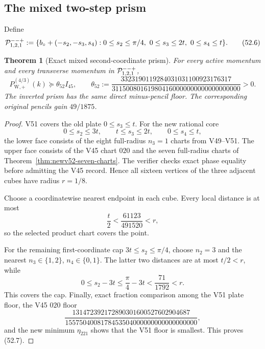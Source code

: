 \documentclass[11pt,oneside]{article}
\newtheorem{theorem}{Theorem}[section]
\theoremstyle{definition}
\theoremstyle{remark}
\begin{document}
\subsection{The mixed two-step prism}

Define
\[
 {\cal P}_{1,2,1}^{--+}:=
 \{b_\circ+(-s_2,-s_3,s_4):
 0\le s_2\le\pi/4,\ 0\le s_3\le2t,\ 0\le s_4\le t\}.
                                                               \tag{52.6}
\]

\begin{theorem}[Exact mixed second-coordinate prism]
\label{thm:newv52-mixed-prism}
For every active momentum and every transverse momentum in
\({\cal P}_{1,2,1}^{--+}\),
\[
 P_{\mathrm W,+}^{(4/3)}(k)
 \succeq\theta_{52}I_{45},\qquad
 \theta_{52}:=
 \frac{3323190119284031031100923176317}
 {311500801619804160000000000000000000}>0.             \tag{52.7}
\]
The inverted prism has the same direct minus-pencil floor.  The
corresponding original pencils gain \(49/1875\).
\end{theorem}

\begin{proof}
V51 covers the old plate \(0\le s_3\le t\).  For the new rational
core
\[
 0\le s_2\le3t,\qquad t\le s_3\le2t,\qquad
 0\le s_4\le t,                                      \tag{52.8}
\]
the lower face consists of the eight full-radius \(n_3=1\) charts
from V49--V51.  The upper face consists of the V45 chart \(020\)
and the seven full-radius charts of
Theorem~\ref{thm:newv52-seven-charts}.  The verifier checks exact
phase equality before admitting the V45 record.  Hence all sixteen
vertices of the three adjacent cubes have radius \(r=1/8\).

Choose a coordinatewise nearest endpoint in each cube.  Every
local distance is at most
\[
 \frac t2<\frac{61123}{491520}<r,                    \tag{52.9}
\]
so the selected product chart covers the point.

For the remaining first-coordinate cap \(3t\le s_2\le\pi/4\),
choose \(n_2=3\) and the nearest
\(n_3\in\{1,2\}\), \(n_4\in\{0,1\}\).  The latter two distances
are at most \(t/2<r\), while
\[
 0\le s_2-3t\le\frac{\pi}{4}-3t
 <\frac{71}{1792}<r.                                  \tag{52.10}
\]
This covers the cap.  Finally, exact fraction comparison among
the V51 plate floor, the V45 \(020\) floor
\[
 \frac{131472392172890301600527602904687}
 {1557504008178453504000000000000000000},
\]
and the new minimum \(\eta_{221}\) shows that the V51 floor is
smallest.  This proves (52.7).
\end{proof}
\end{document}

